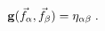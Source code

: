 \begin{equation}
\label{e6:1}
{\bf g}(\vec{f}_{\alpha},\vec{f}_{\beta})=\eta_{\alpha\beta}\;.
\end{equation}

